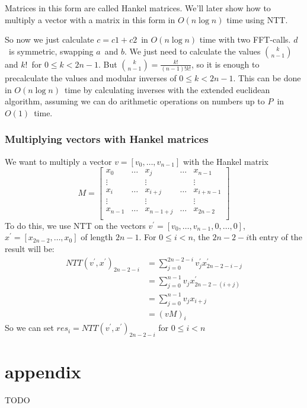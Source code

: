 \documentclass{article}
\begin{document}
Matrices in this form are called Hankel matrices. We'll later show how to multiply a vector with a matrix in this form in $O(n \log n)$ time using NTT.

So now we just calculate $c = c1 + c2$ in $O(n \log n)$ time with two FFT-calls. $d$ is symmetric, swapping $a$ and $b$. We just need to calculate the values
$\binom{k}{n-1}$ and $k!$ for $0 \leq k < 2n-1$. But $\binom{k}{n-1} = \frac{k!}{(n-1)!k!}$, so it is enough to precalculate the values and modular inverses
of $0 \leq k < 2n-1$. This can be done in $O(n \log n)$ time by calculating inverses with the extended euclidean algorithm, assuming we can do arithmetic
operations on numbers up to $P$ in $O(1)$ time.

\subsubsection{Multiplying vectors with Hankel matrices}
We want to multiply a vector $v = [v_{0}, \dots, v_{n-1}]$ with the Hankel matrix
\begin{equation*}
M = \left[\begin{array}{ccccc}
	x_{0}	&\dots	&x_{j}		&\dots	&x_{n-1}\\
	\vdots	&	&\vdots		&	&\vdots\\
	x_{i}	&\dots	&x_{i+j}	&\dots	&x_{i+n-1}\\
	\vdots	&	&\vdots		&	&\vdots\\
	x_{n-1}	&\dots	&x_{n-1+j}	&\dots	&x_{2n-2}\\
	\end{array}\right]
\end{equation*}
To do this, we use NTT on the vectors $v^{'} = [v_{0}, \dots, v_{n-1}, 0, \dots, 0]$, $x^{'} = [x_{2n-2}, \dots, x_{0}]$
of length $2n-1$. For $0 \leq i < n$, the $2n-2-i$th entry of the result will be:
\begin{align*}
NTT(v^{'}, x^{'})_{2n-2-i}	&= \sum_{j = 0}^{2n-2-i} v^{'}_{j} x^{'}_{2n-2-i-j}\\
				&= \sum_{j = 0}^{n-1} v_{j} x^{'}_{2n-2 - (i+j)}\\
				&= \sum_{j = 0}^{n-1} v_{j} x_{i+j}\\
				&= (vM)_{i}
\end{align*}
So we can set $res_{i} = NTT(v^{'}, x^{'})_{2n-2-i}$ for $0 \leq i < n$

\section{appendix}
TODO
\end{document}
